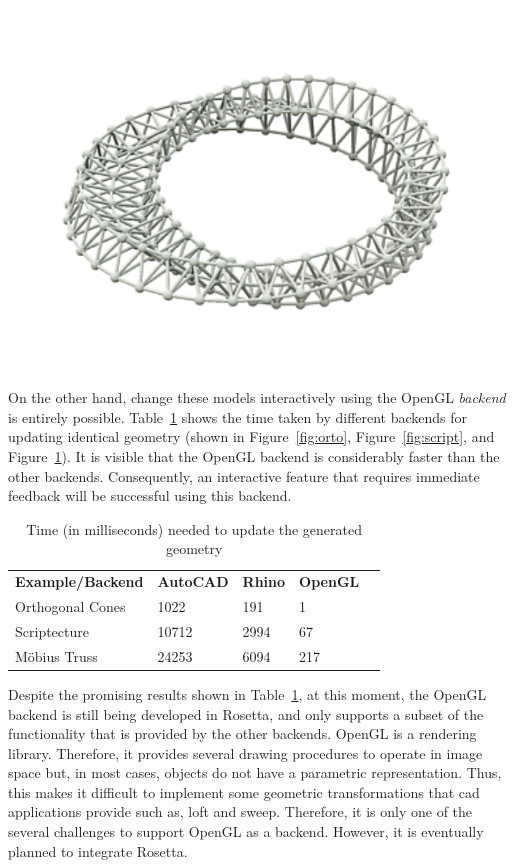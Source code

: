 \begin{figure}[h]
\begin{minipage}[t]{.33\textwidth}
  \includegraphics[width=.8\linewidth]{images/truss}
  \label{fig:mobius}
\end{minipage}
\end{figure}

On the other hand, change these models interactively using the OpenGL \textit{backend} is entirely possible. Table~\ref{tab:runtime} shows the time taken by different backends for updating identical geometry (shown in Figure~\ref{fig:orto}, Figure~\ref{fig:script}, and Figure~\ref{fig:mobius}). It is visible that the OpenGL backend is considerably faster than the other backends. Consequently, an interactive feature that requires immediate feedback will be successful using this backend.

\begin{table}[h]
\centering
\begin{tabular}{@{}lllll@{}}
\cmidrule(r){1-4}
\textbf{Example/Backend} & \textbf{AutoCAD} & \textbf{Rhino} & \textbf{OpenGL} &  \\ \cmidrule(r){1-4}
Orthogonal Cones & 1022 & 191 & 1 &  \\
Scriptecture & 10712 & 2994 & 67 &  \\
Möbius Truss & 24253 & 6094 & 217 &  \\ \cmidrule(r){1-4}
\end{tabular}
\caption{Time (in milliseconds) needed to update the generated geometry}
\label{tab:runtime}
\end{table}

Despite the promising results shown in Table~\ref{tab:runtime}, at this moment, the OpenGL backend is still being developed in Rosetta, and only supports a subset of the functionality that is provided by the other backends. OpenGL is a rendering library. Therefore, it provides several drawing procedures to operate in image space but, in most cases, objects do not have a parametric representation. Thus, this makes it difficult to implement some geometric transformations that \gls{cad} applications provide such as, loft and sweep. Therefore, it is only one of the several challenges to support OpenGL as a backend. However, it is eventually planned to integrate Rosetta.

